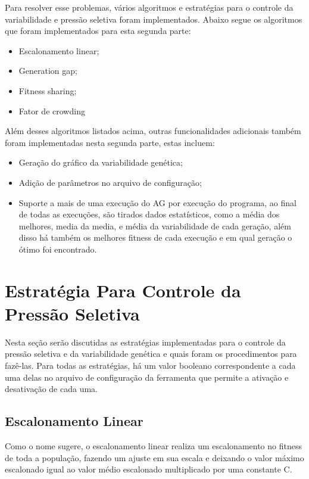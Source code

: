 \documentclass[12pt]{article}
\begin{document}
Para resolver esse problemas, vários algoritmos e estratégias para o controle da variabilidade 
e pressão seletiva foram implementados. Abaixo segue os algoritmos que foram implementados 
para esta segunda parte:
\begin{itemize}
    \item Escalonamento linear;
    \item Generation gap;
    \item Fitness sharing;
    \item Fator de crowding
\end{itemize}

\vspace{1cm}

Além desses algoritmos listados acima, outras funcionalidades adicionais também foram implementadas 
nesta segunda parte, estas incluem: 
\begin{itemize}
    \item Geração do gráfico da variabilidade genética;
    \item Adição de parâmetros no arquivo de configuração;
    \item Suporte a mais de uma execução do AG por execução do programa, ao final de todas as 
        execuções, são tirados dados estatísticos, como a média dos melhores, media da media, e 
        média da variabilidade de cada geração, além disso há também os melhores fitness de cada 
        execução e em qual geração o ótimo foi encontrado.
\end{itemize}

\vspace{1cm}

\section{Estratégia Para Controle da Pressão Seletiva}

Nesta seção serão discutidas as estratégias implementadas para o controle da pressão seletiva e da 
variabilidade genética e quais foram os procedimentos para fazê-las. Para todas as estratégias, há 
um valor booleano correspondente a cada uma delas no arquivo de configuração da ferramenta que 
permite a ativação e desativação de cada uma.

\subsection{Escalonamento Linear}

Como o nome sugere, o escalonamento linear realiza um escalonamento no fitness de toda a população, 
fazendo um ajuste em sua escala e deixando o valor máximo escalonado igual ao valor médio escalonado 
multiplicado por uma constante C.
\end{document}
